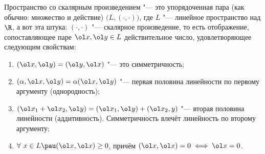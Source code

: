 
	 Пространство со скалярным произведением "--- это упорядоченная пара (как обычно: множество и действие) $\big(L,(\cdot,\cdot)\big)$, где
	 $L$ "--- линейное пространство над $\R$, а вот эта штука: $(\cdot,\cdot)$ "--- скалярное произведение, то есть 
	 отображение, сопоставляющее паре $\ol x,\ol y\in L$ действительное число, удовлетворяющее следующим свойствам:
	 \begin{enumerate}
	   \item $(\ol x,\ol y) = (\ol y,\ol x)$ "--- это симметричность;
	   \item $(\alpha,\ol x,\ol y) = \alpha (\ol x,\ol y)$ "--- первая половина линейности по первому аргументу (однородность);
	   \item $(\ol x_1 + \ol x_2,\ol y) = (\ol x_1,\ol y)+(\ol x_2,y)$ "--- вторая половина линейности (аддитивность). Симметричность влечёт линейность по второму аргументу;
	   \item $\forall\ x\in L\pau (\ol x,\ol x)\geq0$, причём $(\ol x,\ol x)=0\iff\ol x=0$.
	 \end{enumerate}
	 